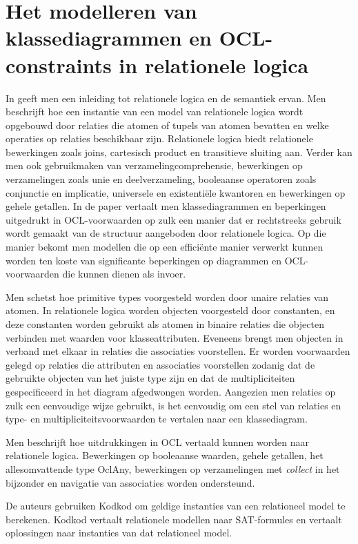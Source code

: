 \section{Het modelleren van klassediagrammen en OCL-constraints in relationele logica}
In \cite{KuhlmannMirco2012FUaO} geeft men een inleiding tot relationele logica en de semantiek ervan. Men beschrijft hoe een instantie van een model van relationele logica wordt opgebouwd door relaties die atomen of tupels van atomen bevatten en welke operaties op relaties beschikbaar zijn. Relationele logica biedt relationele bewerkingen zoals joins, cartesisch product en transitieve sluiting aan. Verder kan men ook gebruikmaken van verzamelingcomprehensie, bewerkingen op verzamelingen zoals unie en deelverzameling, booleaanse operatoren zoals conjunctie en implicatie, universele en existenti\"ele kwantoren en bewerkingen op gehele getallen. In de paper vertaalt men klassediagrammen en beperkingen uitgedrukt in OCL-voorwaarden\cite{WarmerJosB1999Ocl:} op zulk een manier dat er rechtstreeks gebruik wordt gemaakt van de structuur aangeboden door relationele logica. Op die manier bekomt men modellen die op een effici\"ente manier verwerkt kunnen worden ten koste van significante beperkingen op diagrammen en OCL-voorwaarden die kunnen dienen als invoer.

Men schetst hoe primitive types voorgesteld worden door unaire relaties van atomen. In relationele logica worden objecten voorgesteld door constanten, en deze constanten worden gebruikt als atomen in binaire relaties die objecten verbinden met waarden voor klasseattributen. Eveneens brengt men objecten in verband met elkaar in relaties die associaties voorstellen. Er worden voorwaarden gelegd op relaties die attributen en associaties voorstellen zodanig dat de gebruikte objecten van het juiste type zijn en dat de multipliciteiten gespecificeerd in het diagram afgedwongen worden. Aangezien men relaties op zulk een eenvoudige wijze gebruikt, is het eenvoudig om een stel van relaties en type- en multipliciteitsvoorwaarden te vertalen naar een klassediagram.

Men beschrijft hoe uitdrukkingen in OCL vertaald kunnen worden naar relationele logica. Bewerkingen op booleaanse waarden, gehele getallen, het allesomvattende type OclAny\cite{WarmerJosB1999Ocl:}, bewerkingen op verzamelingen met \textit{collect} in het bijzonder en navigatie van associaties worden ondersteund.

De auteurs gebruiken Kodkod\cite{10.1007/978-3-540-71209-1_49} om geldige instanties van een relationeel model te berekenen. Kodkod vertaalt relationele modellen naar SAT-formules en vertaalt oplossingen naar instanties van dat relationeel model.

